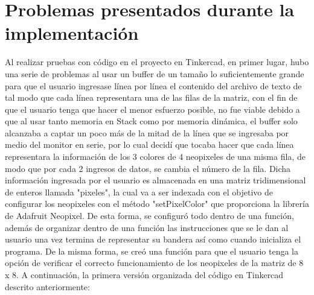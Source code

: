 \documentclass{article}
\begin{document}
\section{Problemas presentados durante la implementación}
Al realizar pruebas con código en el proyecto en Tinkercad, en primer lugar, hubo una serie de problemas al usar un buffer de un tamaño lo suficientemente grande para que el usuario ingresase línea por línea el contenido del archivo de texto de tal modo que cada línea representara una de las filas de la matriz, con el fin de que el usuario tenga que hacer el menor esfuerzo posible, no fue viable debido a que al usar tanto memoria en Stack como por memoria dinámica, el buffer solo alcanzaba a captar un poco más de la mitad de la línea que se ingresaba por medio del monitor en serie, por lo cual decidí que tocaba hacer que cada línea representara la información de los 3 colores de 4 neopixeles de una misma fila, de modo que por cada 2 ingresos de datos, se cambia el número de la fila. Dicha información ingresada por el usuario es almacenada en una matriz tridimensional de enteros llamada "pixeles", la cual va a ser indexada con el objetivo de configurar los neopixeles con el método "setPixelColor" que proporciona la librería de Adafruit Neopixel. De esta forma, se configuró todo dentro de una función, además de organizar dentro de una función las instrucciones que se le dan al usuario una vez termina de representar su bandera así como cuando inicializa el programa. De la misma forma, se creó una función para que el usuario tenga la opción de verificar el correcto funcionamiento de los neopixeles de la matriz de 8 x 8. A continuación, la primera versión organizada del código en Tinkercad descrito anteriormente:
\end{document}
